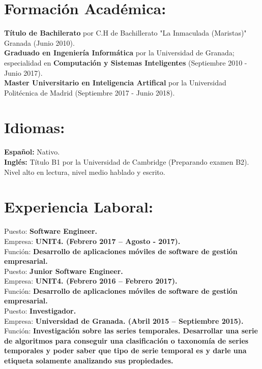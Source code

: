 \documentclass	[10pt,a4paper,oneside]{article}
\newcommand{\seccion}[1]{\vspace*{3mm}\section*{#1}\vspace*{-3mm}}
\begin{document}
\seccion{Formación Acad\'emica:}
\textbf{Título de Bachilerato} por C.H de Bachillerato "La Inmaculada (Maristas)" Granada (Junio 2010).\\
\textbf{Graduado en Ingenier\'ia Inform\'atica} por la Universidad de Granada;
especialidad en \textbf{Computación y Sistemas Inteligentes} (Septiembre 2010 - Junio 2017).\\
\textbf{Master Universitario en Inteligencia Artifical} por la Universidad Politécnica de Madrid (Septiembre 2017 - Junio 2018).\\


\seccion{Idiomas:}
\textbf{Español:} Nativo.\\
\textbf{Inglés:} Título B1 por la Universidad de Cambridge (Preparando examen B2). Nivel alto en lectura, nivel medio hablado y escrito.\\



\seccion{Experiencia Laboral:}

Puesto: \textbf{Software Engineer.}\\
Empresa: \textbf{UNIT4. (Febrero 2017 – Agosto - 2017).}\\
Función: \textbf{Desarrollo de aplicaciones móviles de software de gestión empresarial.}\\

Puesto: \textbf{Junior Software Engineer.}\\
Empresa: \textbf{UNIT4. (Febrero 2016 – Febrero 2017).}\\
Función: \textbf{Desarrollo de aplicaciones móviles de software de gestión empresarial.}\\

Puesto: \textbf{Investigador.}\\
Empresa: \textbf{Universidad de Granada. (Abril 2015 – Septiembre 2015).}\\
Función: \textbf{Investigación sobre las series temporales. Desarrollar una serie de algoritmos para conseguir una clasificación o taxonomía de series temporales y poder saber que tipo de serie temporal es y darle una etiqueta solamente analizando sus propiedades.}\\
\end{document}

